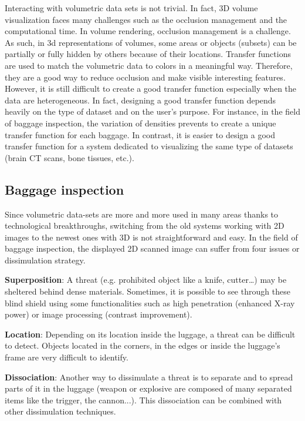   Interacting with volumetric data sets is not trivial. In fact, 3D volume visualization faces many challenges such as the occlusion management and the computational time.
 In volume rendering, occlusion management is a challenge. As such, in 3d representations of volumes, some areas or objects (subsets) can be partially or fully hidden by others because of their locations. Transfer functions are used to match the volumetric data to colors in a meaningful way. Therefore, they are a good way to reduce occlusion and make visible interesting features.  However, it is still difficult to create a good transfer function especially when the data are heterogeneous. In fact, designing a good transfer function depends heavily on the type of dataset and on the user's purpose. For instance, in the field of baggage inspection, the variation of densities prevents to create a unique transfer function for each baggage. In contrast, it is easier to design a good transfer function for a system dedicated to visualizing the same type of datasets (brain CT scans, bone tissues, etc.). 
 
 \subsection{Baggage inspection}
 
  Since volumetric data-sets are more and more used in many areas thanks to technological breakthroughs, switching from the old systems working with 2D images to the newest ones with 3D is not straightforward and easy.  In the field of baggage inspection, the displayed 2D scanned image can suffer from four issues or dissimulation strategy.

\textbf{Superposition}: A threat (e.g. prohibited object like a knife, cutter…) may be sheltered behind dense materials. Sometimes, it is possible to see through these blind shield using some functionalities such as high penetration (enhanced X-ray power) or image processing (contrast improvement). 

\textbf{Location}: Depending on its location inside the luggage, a threat can be difficult to detect. Objects located in the corners, in the edges or inside the luggage's frame are very difficult to identify.

\textbf{Dissociation}: Another way to dissimulate a threat is to separate and to spread parts of it in the luggage (weapon or explosive are composed of many separated items like the trigger, the cannon...). This dissociation can be combined with other dissimulation techniques.

